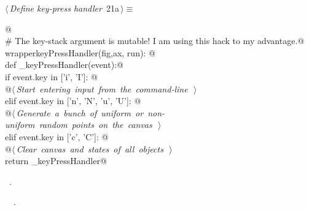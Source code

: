 \documentclass[11.5pt]{report}
\begin{document}
\begin{flushleft} \small
\begin{minipage}{\linewidth}\label{scrap13}\raggedright\small
{} $\langle\,${\itshape Define key-press handler}\nobreak\ {\footnotesize {21a}}$\,\rangle\equiv$
\vspace{-1ex}
\begin{list}{}{} \item
\mbox{}\verb@   @\\
\mbox{}\verb@# The key-stack argument is mutable! I am using this hack to my advantage.@\\
\mbox{}\verb@def wrapperkeyPressHandler(fig,ax, run): @\\
\mbox{}\verb@       def _keyPressHandler(event):@\\
\mbox{}\verb@           if event.key in ['i', 'I']:  @\\
\mbox{}\verb@                @\hbox{$\langle\,${\itshape Start entering input from the command-line}\nobreak\ {\footnotesize {}}$\,\rangle$}\verb@@\\
\mbox{}\verb@           elif event.key in ['n', 'N', 'u', 'U']: @\\
\mbox{}\verb@                @\hbox{$\langle\,${\itshape Generate a bunch of uniform or non-uniform random points on the canvas}\nobreak\ {\footnotesize {}}$\,\rangle$}\verb@@\\
\mbox{}\verb@           elif event.key in ['c', 'C']: @\\
\mbox{}\verb@                @\hbox{$\langle\,${\itshape Clear canvas and states of all objects}\nobreak\ {\footnotesize {}}$\,\rangle$}\verb@@\\
\mbox{}\verb@       return _keyPressHandler@\\
\mbox{}\verb@@{\NWsep}
\end{list}
\vspace{-1.5ex}
\footnotesize
\begin{list}{}{\setlength{\itemsep}{-\parsep}\setlength{\itemindent}{-\leftmargin}}
\item \NWtxtMacroRefIn\ .
\item \NWtxtIdentsDefed\nobreak\  \verb@wrapperkeyPressHandler@\nobreak\ .
\item{}
\end{list}
\end{minipage}\vspace{4ex}
\end{flushleft}
\end{document}
